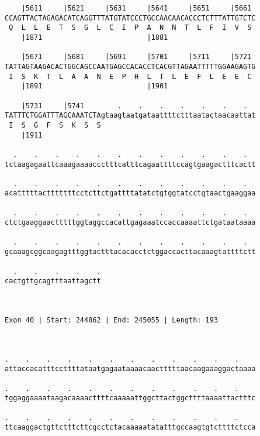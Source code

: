 \documentclass{article}
\begin{document}
\begin{Verbatim}
    |5611     |5621     |5631     |5641     |5651     |5661 
CCAGTTACTAGAGACATCAGGTTTATGTATCCCTGCCAACAACACCCTCTTTATTGTCTC
 Q  L  L  E  T  S  G  L  C  I  P  A  N  N  T  L  F  I  V  S 
    |1871                         |1881                     
  
    |5671     |5681     |5691     |5701     |5711     |5721 
TATTAGTAAGACACTGGCAGCCAATGAGCCACACCTCACGTTAGAATTTTTGGAAGAGTG
 I  S  K  T  L  A  A  N  E  P  H  L  T  L  E  F  L  E  E  C 
    |1891                         |1901                     
  
    |5731     |5741        .    .    .    .    .    .    .  
TATTTCTGGATTTAGCAAATCTAgtaagtaatgataattttctttaatactaacaattat
 I  S  G  F  S  K  S  S                                     
    |1911                                                   
  
  .    .    .    .    .    .    .    .    .    .    .    .  
tctaagagaattcaaagaaaaccctttcatttcagaattttccagtgaagactttcactt
                                                            
  .    .    .    .    .    .    .    .    .    .    .    .  
acatttttactttttttcctcttctgattttatatctgtggtatcctgtaactgaaggaa
                                                            
  .    .    .    .    .    .    .    .    .    .    .    .  
ctctgaaggaactttttggtaggccacattgagaaatccaccaaaattctgataataaaa
                                                            
  .    .    .    .    .    .    .    .    .    .    .    .  
gcaaagcggcaagagtttggtactttacacacctctggaccacttacaaagtattttctt
                                                            
  .    .    .    .    .
cactgttgcagtttaattagctt
                       
                       
 
Exon 40 | Start: 244862 | End: 245055 | Length: 193



.    .    .    .    .    .    .    .    .    .    .    .    
attaccacatttccttttataatgagaataaaacaactttttaacaagaaaggactaaaa
                                                            
.    .    .    .    .    .    .    .    .    .    .    .    
tggaggaaaataagacaaaacttttcaaaaattggcttactggcttttaaaattactttc
                                                            
.    .    .    .    .    .    .    .    .    .    .    .    
ttcaaggactgttctttcttcgcctctacaaaaatatatttgccaagtgtcttttctcca
                                                            

\end{Verbatim}
\end{document}
